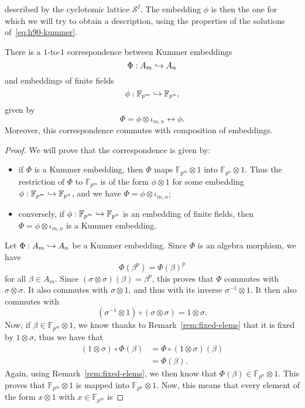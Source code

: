 described by the cyclotomic lattice $\mathcal S^I$. The embedding $\phi$ is then the one for
which we will try to obtain a description, using the properties of the solutions
of~\eqref{eq:h90-kummer}.
\begin{prop}
  \label{prop:correspondence-embeddings}
  There is a $1$-to-$1$ correspondence between Kummer embeddings
  \[
    \Phi:A_m\hookrightarrow A_n
  \]
  and embeddings of finite fields
  \[
    \phi:\mathbb{F}_{p^m}\hookrightarrow\mathbb{F}_{p^n},
  \]
  given by
  \[
    \Phi=\phi\otimes\iota_{m, n}\longleftrightarrow \phi.
  \]
  Moreover, this correspondence commutes with composition of embeddings.
\end{prop}
\begin{proof}
  We will prove that the correspondence is given by:
  \begin{itemize}
    \item if $\Phi$ is a Kummer embedding, then $\Phi$ maps
      $\mathbb{F}_{p^m}\otimes1$ into $\mathbb{F}_{p^n}\otimes1$. Thus the
      restriction of $\Phi$ to $\mathbb{F}_{p^m}$ is of the form $\phi\otimes1$
      for some embedding $\phi:\mathbb{F}_{p^m}\hookrightarrow\mathbb{F}_{p^n}$, and we
      have $\Phi=\phi\otimes\iota_{m, n}$;
    \item conversely, if $\phi:\mathbb{F}_{p^m}\hookrightarrow\mathbb{F}_{p^n}$ is an
      embedding of finite fields, then $\Phi=\phi\otimes\iota_{m, n}$ is a
      Kummer embedding.
  \end{itemize}
 Let $\Phi:A_m\hookrightarrow A_n$ be a Kummer embedding. Since $\Phi$ is an algebra
 morphism, we have 
 \[
   \Phi(\beta^p) = \Phi(\beta)^p
 \]
for all $\beta\in A_m$. Since $(\sigma\otimes\sigma)(\beta) = \beta^p$, this
proves that $\Phi$ commutes with $\sigma\otimes\sigma$. It also
commutes with $\sigma\otimes1$, and thus with its inverse $\sigma^{-1}\otimes1$.
It then also commutes with
\[
  (\sigma^{-1}\otimes1)\circ(\sigma\otimes\sigma) = 1\otimes\sigma.
\]
Now, if $\beta\in\mathbb{F}_{p^m}\otimes1$, we know thanks
to Remark~\ref{rem:fixed-elems} that it is fixed by $1\otimes\sigma$, thus we have that
\begin{align*}
 (1\otimes\sigma)\circ\Phi(\beta) &= \Phi\circ(1\otimes\sigma)(\beta)\\
 &= \Phi(\beta).
\end{align*}
Again, using Remark~\ref{rem:fixed-elems}, we then know that
$\Phi(\beta)\in\mathbb{F}_{p^n}\otimes1$. This proves that
$\mathbb{F}_{p^m}\otimes1$ is mapped into $\mathbb{F}_{p^n}\otimes1$. Now, this
means that every element of the form $x\otimes1$ with $x\in\mathbb{F}_{p^m}$ is

\end{proof}
